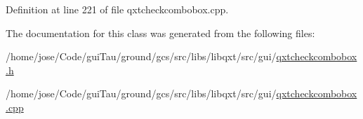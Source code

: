 Definition at line 221 of file qxtcheckcombobox.\-cpp.



The documentation for this class was generated from the following files\-:\begin{DoxyCompactItemize}
\item 
/home/jose/\-Code/gui\-Tau/ground/gcs/src/libs/libqxt/src/gui/\hyperlink{qxtcheckcombobox_8h}{qxtcheckcombobox.\-h}\item 
/home/jose/\-Code/gui\-Tau/ground/gcs/src/libs/libqxt/src/gui/\hyperlink{qxtcheckcombobox_8cpp}{qxtcheckcombobox.\-cpp}\end{DoxyCompactItemize}
